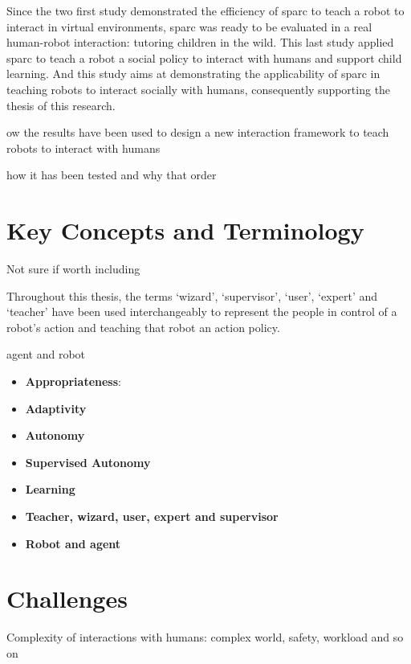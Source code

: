 Since the two first study demonstrated the efficiency of \gls{sparc} to teach a robot to interact in virtual environments, \gls{sparc} was ready to be evaluated in a real human-robot interaction: tutoring children in the wild. This last study applied \gls{sparc} to teach a robot a social policy to interact with humans and support child learning. And this study aims at demonstrating the applicability of \gls{sparc} in teaching robots to interact socially with humans, consequently supporting the thesis of this research.

ow the results have been used to design a new interaction framework to teach robots to interact with humans

how it has been tested and why that order

\section{Key Concepts and Terminology}\label{sec:intro-concepts}

Not sure if worth including

Throughout this thesis, the terms `wizard', `supervisor', `user', `expert' and `teacher' have been used interchangeably to represent the people in control of a robot's action and teaching that robot an action policy.

agent and robot

\begin{itemize}
	\item \textbf{Appropriateness}:
	\item \textbf{Adaptivity}
	\item \textbf{Autonomy}
	\item \textbf{Supervised Autonomy}
	\item \textbf{Learning}
	\item \textbf{Teacher, wizard, user, expert and supervisor}
	\item \textbf{Robot and agent}
\end{itemize}

\section{Challenges}

Complexity of interactions with humans: complex world, safety, workload and so on


